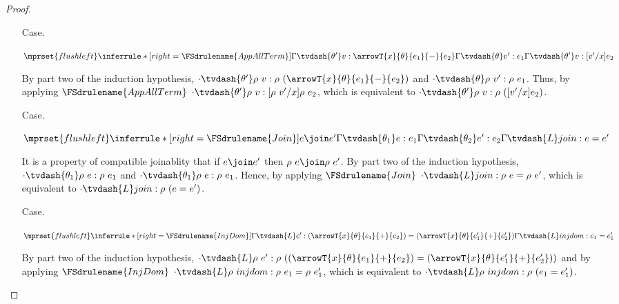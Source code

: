 \begin{proof}
\begin{itemize}
  \item[Case.]\ \\
    \begin{center}
      \begin{math}
        $$\mprset{flushleft}
        \inferrule*[right=\FSdrulename{AppAllTerm}]{
          \Gamma \tvdash{\theta'} v:\arrowT{x}{\theta}{e_1}{-}{e_2}
          \\\\
          \Gamma \tvdash{\theta} v':e_1
        }{\Gamma \tvdash{\theta'} v:[v'/x]e_2}
      \end{math}
    \end{center}
    By part two of the induction hypothesis, 
    $\cdot \tvdash{\theta'} \rho\ v:\rho\ (\arrowT{x}{\theta}{e_1}{-}{e_2})$ and
    $\cdot \tvdash{\theta} \rho\ v':\rho\ e_1$.  Thus, by applying $\FSdrulename{AppAllTerm}$
    $\cdot \tvdash{\theta'} \rho\ v:[\rho\ v'/x]\rho\ e_2$, which is equivalent to
    $\cdot \tvdash{\theta'} \rho\ v:\rho\ ([v'/x]e_2)$.

  \item[Case.]\ \\
    \begin{center}
      \begin{math}
        $$\mprset{flushleft}
        \inferrule* [right=\FSdrulename{Join}] {
          e \join e'
          \\\\
          \Gamma \tvdash{\theta_1} e:e_1
          \\\\
          \Gamma \tvdash{\theta_2} e':e_2
        }{\Gamma \tvdash{L} join : e = e'}
      \end{math}
    \end{center}
    It is a property of compatible joinablity that if $e \join e'$ then
    $\rho\ e \join \rho\ e'$.  By part two of the induction hypothesis,
    $\cdot \tvdash{\theta_1} \rho\ e:\rho\ e_1$ and $\cdot \tvdash{\theta_1} \rho\ e:\rho\ e_1$.
    Hence, by applying $\FSdrulename{Join}$ $\cdot \tvdash{L} join : \rho\ e = \rho\ e'$, which 
    is equivalent to $\cdot \tvdash{L} join : \rho\ (e = e')$.

  \item[Case.]\ \\
    \begin{center}
      \begin{math}
        $$\mprset{flushleft}
        \inferrule* [right=\FSdrulename{InjDom}] {
          \Gamma \tvdash{L} e':(\arrowT{x}{\theta}{e_1}{+}{e_2}) = 
          (\arrowT{x}{\theta}{e'_1}{+}{e'_2})
        }{\Gamma \tvdash{L} injdom : e_1 = e'_1}
      \end{math}
    \end{center}
    By part two of the induction hypothesis, 
    $\cdot \tvdash{L} \rho\ e':\rho\ ((\arrowT{x}{\theta}{e_1}{+}{e_2}) = 
    (\arrowT{x}{\theta}{e'_1}{+}{e'_2}))$ and by applying $\FSdrulename{InjDom}$
    $\cdot \tvdash{L} \rho\ injdom : \rho\ e_1 = \rho\ e'_1$, which is equivalent to
    $\cdot \tvdash{L} \rho\ injdom : \rho\ (e_1 = e'_1)$.
    

\end{itemize}
\end{proof}
